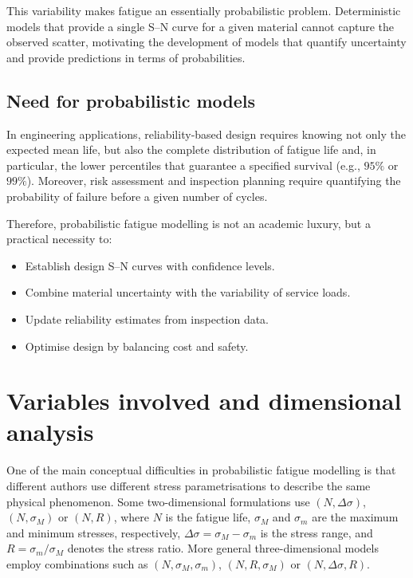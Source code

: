 This variability makes fatigue an essentially probabilistic problem. Deterministic models that provide a single S–N curve for a given material cannot capture the observed scatter, motivating the development of models that quantify uncertainty and provide predictions in terms of probabilities.

\subsection{Need for probabilistic models}

In engineering applications, reliability‑based design requires knowing not only the expected mean life, but also the complete distribution of fatigue life and, in particular, the lower percentiles that guarantee a specified survival (e.g., $95\%$ or $99\%$). Moreover, risk assessment and inspection planning require quantifying the probability of failure before a given number of cycles.

Therefore, probabilistic fatigue modelling is not an academic luxury, but a practical necessity to:
\begin{itemize}
    \item Establish design S–N curves with confidence levels.
    \item Combine material uncertainty with the variability of service loads.
    \item Update reliability estimates from inspection data.
    \item Optimise design by balancing cost and safety.
\end{itemize}

\section{Variables involved and dimensional analysis}
\label{sec:variables-dimensional}

One of the main conceptual difficulties in probabilistic fatigue modelling is that different authors use different stress parametrisations to describe the same physical phenomenon. Some two-dimensional formulations use $(N,\Delta\sigma)$, $(N,\sigma_M)$ or $(N,R)$, where $N$ is the fatigue life, $\sigma_M$ and $\sigma_m$ are the maximum and minimum stresses, respectively, $\Delta\sigma=\sigma_M-\sigma_m$ is the stress range, and $R=\sigma_m/\sigma_M$ denotes the stress ratio. More general three-dimensional models employ combinations such as $(N,\sigma_M,\sigma_m)$, $(N,R,\sigma_M)$ or $(N,\Delta\sigma,R)$.

